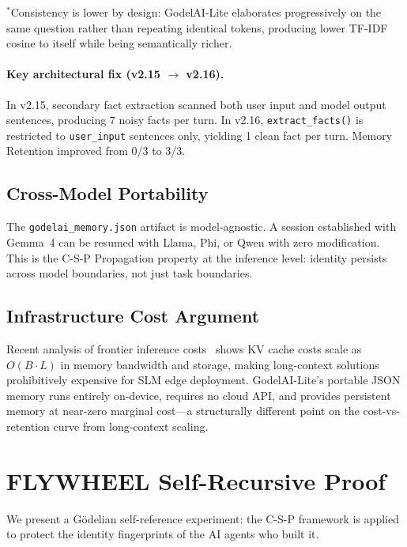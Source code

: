 \documentclass[12pt]{article}
\begin{document}
\noindent $^*$Consistency is lower by design: GodelAI-Lite elaborates
progressively on the same question rather than repeating identical tokens,
producing lower TF-IDF cosine to itself while being semantically richer.

\paragraph{Key architectural fix (v2.15 $\to$ v2.16).}
In v2.15, secondary fact extraction scanned both user input and model output
sentences, producing 7 noisy facts per turn.
In v2.16, \texttt{extract\_facts()} is restricted to \texttt{user\_input}
sentences only, yielding 1 clean fact per turn.
Memory Retention improved from 0/3 to 3/3.

\subsection{Cross-Model Portability}

The \texttt{godelai\_memory.json} artifact is model-agnostic.
A session established with Gemma~4 can be resumed with Llama, Phi, or Qwen
with zero modification.
This is the C-S-P Propagation property at the inference level:
identity persists across model boundaries, not just task boundaries.

\subsection{Infrastructure Cost Argument}

Recent analysis of frontier inference costs~\citep{reinerpope2026} shows
KV cache costs scale as $O(B \cdot L)$ in memory bandwidth and storage,
making long-context solutions prohibitively expensive for SLM edge deployment.
GodelAI-Lite's portable JSON memory runs entirely on-device, requires no
cloud API, and provides persistent memory at near-zero marginal cost---a
structurally different point on the cost-vs-retention curve from
long-context scaling.

\section{FLYWHEEL Self-Recursive Proof}
\label{sec:flywheel}

We present a G\"{o}delian self-reference experiment: the C-S-P framework is
applied to protect the identity fingerprints of the AI agents who built it.
\end{document}
